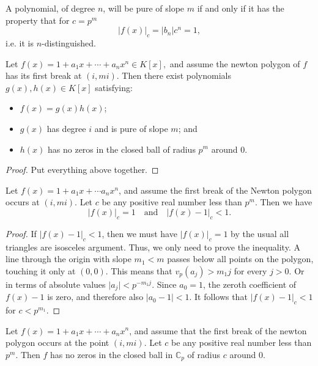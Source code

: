 \begin{proposition}
  A polynomial, of degree $n$, will be pure of slope $m$ if and only if it has the property that for
  $c = p^m$
  \[
  \lvert f(x) \rvert_c = \lvert b_n \rvert c^n = 1,
  \]
  i.e. it is $n$-distinguished.
\end{proposition}

\begin{theorem}
  Let $f(x) = 1 + a_1 x + \cdots + a_n x^n \in K[x],$ and assume the newton polygon of $f$ has its
  first break at $(i,mi)$. Then there exist polynomials $g(x), h(x) \in K[x]$ satisfying:
  \begin{itemize}
    \item $f(x) = g(x) h(x)$;
    \item $g(x)$ has degree $i$ and is pure of slope $m$; and
    \item $h(x)$ has no zeros in the closed ball of radius $p^m$ around 0.
  \end{itemize}
\end{theorem}

\begin{proof}
  Put everything above together.
\end{proof}

\begin{lemma}
  Let $f(x) = 1 + a_1 x + \cdots a_n x^n$, and assume the first break of the Newton polygon occurs
  at $(i,mi)$. Let $c$ be any positive real number less than $p^m$. Then we have
  \[
    \lvert f(x) \rvert_c = 1 \quad \text{and} \quad \lvert f(x) - 1 \rvert_c < 1.
  \]
\end{lemma}

\begin{proof}
  If $\lvert f(x) - 1 \rvert_c < 1$, then we must have $\lvert f (x) \rvert_c = 1$ by the usual all
  triangles are isosceles argument. Thus, we only need to prove the inequality.
  A line through the origin with slope $m_1 < m$ passes below all points on the polygon, touching it
  only at $(0,0)$. This means that $v_p(a_j) > m_1 j$ for every $j > 0$. Or in terms of absolute
  values $\lvert a_j \rvert < p^{-m_1 j}.$ Since $a_0 = 1$, the zeroth coefficient of $f(x) - 1$ is
  zero, and therefore also $\lvert a_0 - 1 \rvert < 1.$ It follows that $\lvert f(x) - 1 \rvert_c < 1$
  for $c < p^{m_1}$.
\end{proof}

\begin{lemma}
  Let $f(x) = 1 + a_1 x + \cdots + a_n x^n$, and assume that the first break of the newton polygon
  occurs at the point $(i,mi)$. Let $c$ be any positive real number less than $p^m$. Then $f$ has no
  zeros in the closed ball in $\mathbb{C}_p$ of radius $c$ around 0.
\end{lemma}

